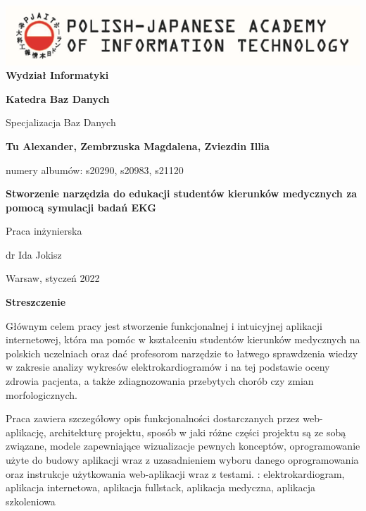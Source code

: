 \documentclass[singlespacing,12pt,parskip,headsepline,consistentlayout]{article}
\date{}
\begin{document}
\begin{titlepage}
\begin{center}
    

\includegraphics{pjatk_icon.png}
\vspace{1cm}
{\bfseries Wydział Informatyki}

\vspace{1cm}
{\bfseries Katedra Baz Danych}

{Specjalizacja Baz Danych}

\vspace{3cm}
{\bfseries Tu Alexander, Zembrzuska Magdalena, Zviezdin Illia}

{numery albumów: s20290, s20983, s21120}

\vspace{2cm}

{\bfseries Stworzenie narzędzia do edukacji studentów kierunków medycznych za pomocą symulacji badań EKG }

\vspace{2cm}
\end{center}
\begin{flushright}
{Praca inżynierska}

{dr Ida Jokisz}    
\end{flushright}


\vfill
\begin{center}
{Warsaw, styczeń  2022}    
\end{center}


\end{titlepage}
\pagebreak

\begin{titlepage}
\begin{center}
    {\large\bfseries Streszczenie}
\end{center}




{Głównym celem pracy jest stworzenie funkcjonalnej i intuicyjnej aplikacji internetowej, która ma pomóc w kształceniu studentów kierunków medycznych na polskich uczelniach oraz dać profesorom narzędzie to łatwego sprawdzenia wiedzy w zakresie analizy wykresów elektrokardiogramów i na tej podstawie oceny zdrowia pacjenta, a także zdiagnozowania przebytych chorób czy zmian morfologicznych.}

\vspace{1cm}

{Praca zawiera szczegółowy opis funkcjonalności dostarczanych przez web-aplikację, architekturę projektu, sposób w jaki różne części projektu są ze sobą związane, modele zapewniające wizualizacje pewnych konceptów, oprogramowanie użyte do budowy aplikacji wraz z uzasadnieniem wyboru danego oprogramowania oraz instrukcje użytkowania web-aplikacji wraz z testami.}
\vfill
{}: elektrokardiogram, aplikacja internetowa, aplikacja fullstack, aplikacja medyczna, aplikacja szkoleniowa
\end{titlepage}
\end{document}
